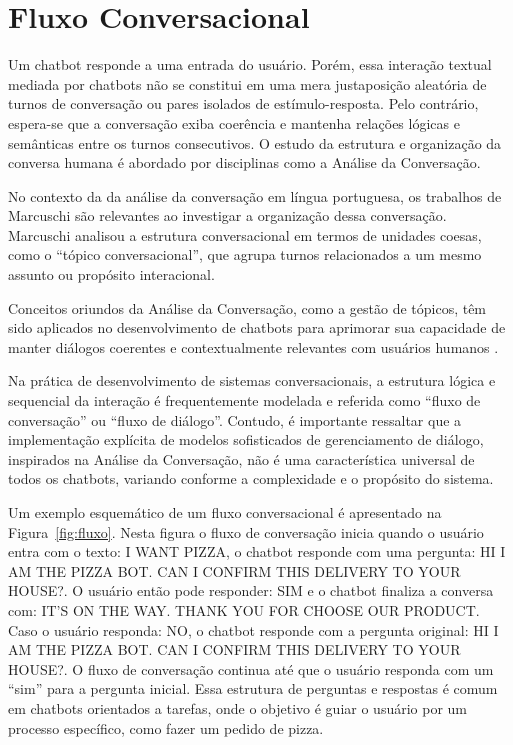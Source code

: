 \documentclass[14pt,a4paper,oneside]{book}
\begin{document}
\section{Fluxo Conversacional}

Um chatbot responde a uma entrada do usuário. Porém, essa interação textual mediada por chatbots não se constitui em uma mera justaposição aleatória de turnos de conversação ou pares isolados de estímulo-resposta. Pelo contrário, espera-se que a conversação exiba coerência e mantenha relações lógicas e semânticas entre os turnos consecutivos. O estudo da estrutura e organização da conversa humana é abordado por disciplinas como a Análise da Conversação.

No contexto da da análise da conversação em língua portuguesa, os trabalhos de Marcuschi \cite{Marchuschi1986} são relevantes ao investigar a organização dessa conversação. Marcuschi analisou a estrutura conversacional em termos de unidades coesas, como o ``tópico conversacional'', que agrupa turnos relacionados a um mesmo assunto ou propósito interacional.

Conceitos oriundos da Análise da Conversação, como a gestão de tópicos, têm sido aplicados no desenvolvimento de chatbots para aprimorar sua capacidade de manter diálogos coerentes e contextualmente relevantes com usuários humanos \cite{Neves2005}.

Na prática de desenvolvimento de sistemas conversacionais, a estrutura lógica e sequencial da interação é frequentemente modelada e referida como ``fluxo de conversação'' ou ``fluxo de diálogo''. Contudo, é importante ressaltar que a implementação explícita de modelos sofisticados de gerenciamento de diálogo, inspirados na Análise da Conversação, não é uma característica universal de todos os chatbots, variando conforme a complexidade e o propósito do sistema. 

Um exemplo esquemático de um fluxo conversacional é apresentado na Figura~\ref{fig:fluxo}. Nesta figura o fluxo de conversação inicia quando o usuário entra com o texto: I WANT PIZZA, o chatbot responde com uma pergunta: HI I AM THE PIZZA BOT. CAN I CONFIRM THIS DELIVERY TO YOUR HOUSE?. O usuário então pode responder: SIM e o chatbot finaliza a conversa com: IT'S ON THE WAY. THANK YOU FOR CHOOSE OUR PRODUCT. Caso o usuário responda: NO, o chatbot responde com a pergunta original: HI I AM THE PIZZA BOT. CAN I CONFIRM THIS DELIVERY TO YOUR HOUSE?. O fluxo de conversação continua até que o usuário responda com um ``sim'' para a pergunta inicial. Essa estrutura de perguntas e respostas é comum em chatbots orientados a tarefas, onde o objetivo é guiar o usuário por um processo específico, como fazer um pedido de pizza.
\end{document}
